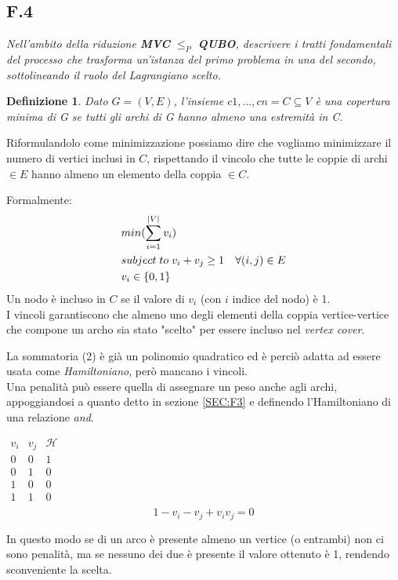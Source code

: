 \documentclass[a4paper]{article}
\newtheorem*{definition}{Definizione}
\begin{document}
\subsection{F.4}
\label{SEC:F4}
\emph{Nell’ambito della riduzione \textbf{MVC} $\leq_P$ \textbf{QUBO}, descrivere i tratti fondamentali del processo che trasforma un’istanza del primo problema in una del secondo, sottolineando il ruolo del Lagrangiano scelto.}
\begin{definition}
	Dato $G = (V, E)$, l’insieme ${c1,. . . , cn} = C \subseteq V$ è una copertura minima di G se tutti gli archi di G hanno almeno una estremità in C.
\end{definition}
Riformulandolo come minimizzazione possiamo dire che vogliamo minimizzare il numero di vertici inclusi in $C$, rispettando il vincolo che tutte le coppie di archi $\in E$ hanno almeno un elemento della coppia $\in C$.

Formalmente:
\begin{align}
	&min(\sum_{i=1}^{\lvert V \rvert}v_i)\\
	&subject \; to \; v_i + v_j \geq 1 \quad \forall (i,j) \in E \\
	& v_i \in \{0,1\} \notag
\end{align}
Un nodo è incluso in $C$ se il valore di $v_i$ (con $i$ indice del nodo) è 1.\\
I vincoli garantiscono che almeno uno degli elementi della coppia vertice-vertice che compone un archo sia stato "scelto" per essere incluso nel \textit{vertex cover}.

La sommatoria (2) è già un polinomio quadratico ed è perciò adatta ad essere usata come \textit{Hamiltoniano}, però mancano i vincoli.\\
Una penalità può essere quella di assegnare un peso anche agli archi, appoggiandosi a quanto detto in sezione \ref{SEC:F3} e definendo l'Hamiltoniano di una relazione \textit{and}.
\begin{center}$\begin{array}{c|c|c}
 v_i & v_j & \mathcal{H}\\
\hline
 0 & 0 & 1  \\
 0 & 1 & 0  \\
 1 & 0 & 0  \\
 1 & 1 & 0  \\ %
\end{array}$
$$ 1- v_i - v_j +v_iv_j = 0$$
\end{center}
In questo modo se di un arco è presente almeno un vertice (o entrambi) non ci sono penalità, ma se nessuno dei due è presente il valore ottenuto è 1, rendendo sconveniente la scelta.
\end{document}
